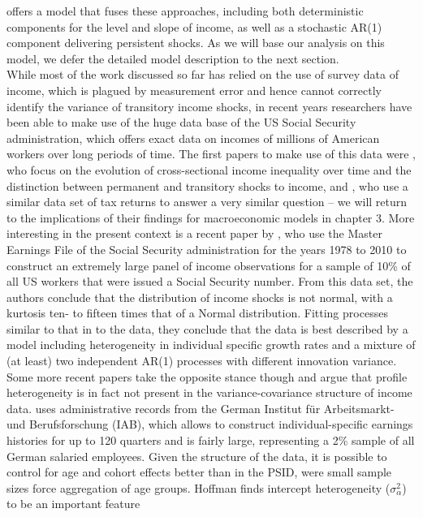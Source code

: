 offers a model that fuses these approaches, including both deterministic 
components for the level and slope of income, as well as a stochastic AR(1)
component delivering persistent shocks. As we will base our analysis on this 
model, we defer the detailed model description to the next section. \\
While most of the work discussed so far has relied on the use of survey data of
income, which is plagued by measurement error and hence cannot correctly identify
the variance of transitory income shocks, in recent years researchers have been 
able to make use of the huge data base of the US Social Security administration,
which offers exact data on incomes of millions of American workers over long 
periods of time. The first papers to make use of this data were \citet{KopczukSaezSong2010},
who focus on the evolution of cross-sectional income inequality over time and
the distinction between permanent and transitory shocks to income, and 
\citet{DHPRV2013}, who use a similar data set of tax returns to answer a very 
similar question -- we will return to the implications of their findings for 
macroeconomic models in chapter 3. More interesting in the present context is
a recent paper by \citet{GKOS2015}, who use the Master Earnings
File of the Social Security administration for the years 1978 to 2010 to 
construct an extremely large panel of income observations for a sample of 10\%
of all US workers that were issued a Social Security number. From this data set,
the authors conclude that the distribution of income shocks is not normal, with
a kurtosis ten- to fifteen times that of a Normal distribution. Fitting processes
similar to that in \citet{Guvenen2009} to the data, they conclude that the data
is best described by a model including heterogeneity in individual specific 
growth rates and a mixture of (at least) two independent AR(1) processes with 
different innovation variance. 
Some more recent papers take the opposite stance though and argue that profile
heterogeneity is in fact not present in the variance-covariance structure of 
income data. \citet{Hoffmann2013} uses administrative records from the German
Institut f\"ur Arbeitsmarkt- und Berufsforschung (IAB), which allows to construct
individual-specific earnings histories for up to 120 quarters and is fairly large,
representing a 2\% sample of all German salaried employees. Given the structure 
of the data, it is possible to control for age and cohort effects better than 
in the PSID, were small sample sizes force aggregation of age groups. Hoffman 
finds intercept heterogeneity ($\sigma^2_{\alpha}$) to be an important feature
